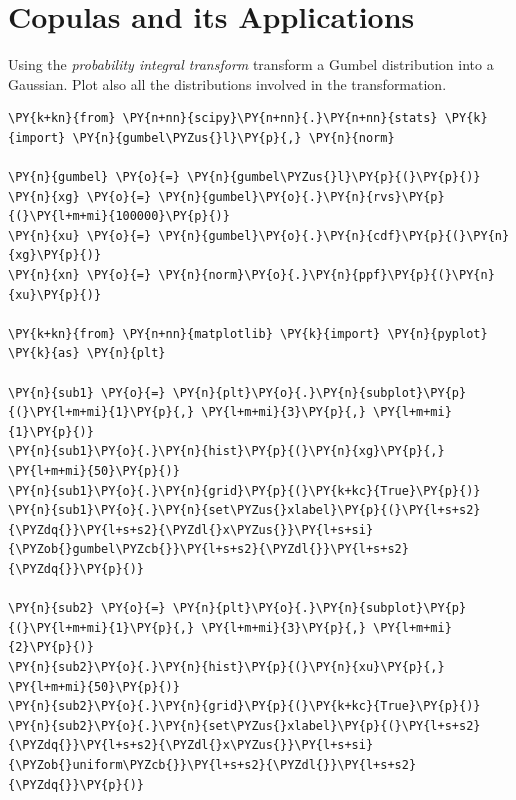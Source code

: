 \chapter{Copulas and its Applications}\label{introduction-to-python---lesson-11}

\begin{Exercise}[title={(Distribution Transformation)}]
	Using the \emph{probability integral transform} transform a Gumbel distribution into a Gaussian. Plot also all the distributions involved in the transformation.
\end{Exercise}

\begin{Answer}
\begin{codebox}[size=fbox, boxrule=1pt, colback=cellbackground, colframe=cellborder]
\begin{Verbatim}[commandchars=\\\{\}]
\PY{k+kn}{from} \PY{n+nn}{scipy}\PY{n+nn}{.}\PY{n+nn}{stats} \PY{k}{import} \PY{n}{gumbel\PYZus{}l}\PY{p}{,} \PY{n}{norm}
	
\PY{n}{gumbel} \PY{o}{=} \PY{n}{gumbel\PYZus{}l}\PY{p}{(}\PY{p}{)}
\PY{n}{xg} \PY{o}{=} \PY{n}{gumbel}\PY{o}{.}\PY{n}{rvs}\PY{p}{(}\PY{l+m+mi}{100000}\PY{p}{)}
\PY{n}{xu} \PY{o}{=} \PY{n}{gumbel}\PY{o}{.}\PY{n}{cdf}\PY{p}{(}\PY{n}{xg}\PY{p}{)}
\PY{n}{xn} \PY{o}{=} \PY{n}{norm}\PY{o}{.}\PY{n}{ppf}\PY{p}{(}\PY{n}{xu}\PY{p}{)}

\PY{k+kn}{from} \PY{n+nn}{matplotlib} \PY{k}{import} \PY{n}{pyplot} \PY{k}{as} \PY{n}{plt}

\PY{n}{sub1} \PY{o}{=} \PY{n}{plt}\PY{o}{.}\PY{n}{subplot}\PY{p}{(}\PY{l+m+mi}{1}\PY{p}{,} \PY{l+m+mi}{3}\PY{p}{,} \PY{l+m+mi}{1}\PY{p}{)}
\PY{n}{sub1}\PY{o}{.}\PY{n}{hist}\PY{p}{(}\PY{n}{xg}\PY{p}{,} \PY{l+m+mi}{50}\PY{p}{)}
\PY{n}{sub1}\PY{o}{.}\PY{n}{grid}\PY{p}{(}\PY{k+kc}{True}\PY{p}{)}
\PY{n}{sub1}\PY{o}{.}\PY{n}{set\PYZus{}xlabel}\PY{p}{(}\PY{l+s+s2}{\PYZdq{}}\PY{l+s+s2}{\PYZdl{}x\PYZus{}}\PY{l+s+si}{\PYZob{}gumbel\PYZcb{}}\PY{l+s+s2}{\PYZdl{}}\PY{l+s+s2}{\PYZdq{}}\PY{p}{)}

\PY{n}{sub2} \PY{o}{=} \PY{n}{plt}\PY{o}{.}\PY{n}{subplot}\PY{p}{(}\PY{l+m+mi}{1}\PY{p}{,} \PY{l+m+mi}{3}\PY{p}{,} \PY{l+m+mi}{2}\PY{p}{)}
\PY{n}{sub2}\PY{o}{.}\PY{n}{hist}\PY{p}{(}\PY{n}{xu}\PY{p}{,} \PY{l+m+mi}{50}\PY{p}{)}
\PY{n}{sub2}\PY{o}{.}\PY{n}{grid}\PY{p}{(}\PY{k+kc}{True}\PY{p}{)}
\PY{n}{sub2}\PY{o}{.}\PY{n}{set\PYZus{}xlabel}\PY{p}{(}\PY{l+s+s2}{\PYZdq{}}\PY{l+s+s2}{\PYZdl{}x\PYZus{}}\PY{l+s+si}{\PYZob{}uniform\PYZcb{}}\PY{l+s+s2}{\PYZdl{}}\PY{l+s+s2}{\PYZdq{}}\PY{p}{)}


\end{Verbatim}
\end{codebox}
\end{Answer}
